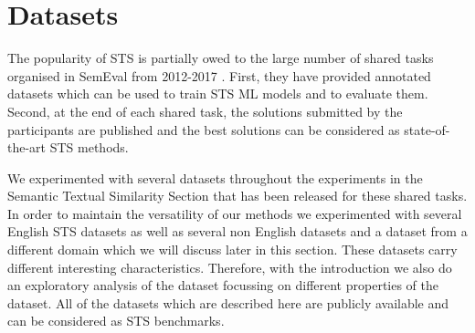 \section{Datasets}
\label{sec:sts_intro_datsets}
The popularity of STS is partially owed to the large number of shared tasks organised in SemEval from 2012-2017 \cite{agirre-etal-2012-semeval,agirre-etal-2013-sem,agirre-etal-2014-semeval,agirre-etal-2015-semeval,agirre-etal-2016-semeval,cer-etal-2017-semeval}. First, they have provided annotated datasets which can be used to train STS ML models and to evaluate them. Second, at the end of each shared task, the solutions submitted by the participants are published and the best solutions can be considered as state-of-the-art STS methods. 

We experimented with several datasets throughout the experiments in the Semantic Textual Similarity Section that has been released for these shared tasks. In order to maintain the versatility of our methods we experimented with several English STS datasets as well as several non English datasets and a dataset from a different domain which we will discuss later in this section. These datasets carry different interesting characteristics. Therefore, with the introduction we also do an exploratory analysis of the dataset focussing on different properties of the dataset. All of the datasets which are described here are publicly available and can be considered as STS benchmarks. 

